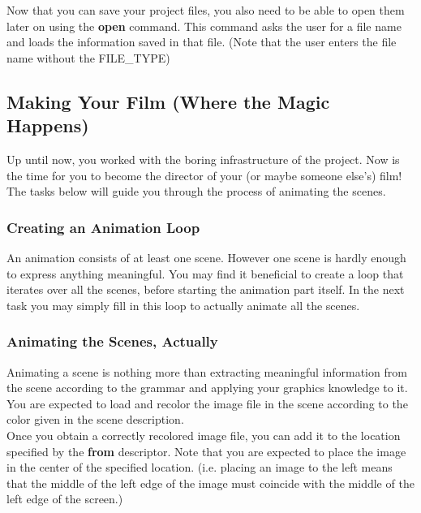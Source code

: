 \documentclass[a4paper]{article}
\begin{document}
	Now that you can save your project files, you also need to be able to open them later on using the \textbf{open} command. This command asks the user for a file name and loads the information saved in that file. (Note that the user enters the file name without the FILE\_TYPE)
	
	\subsection{Making Your Film (Where the Magic Happens)}
	Up until now, you worked with the boring infrastructure of the project. Now is the time for you to become the director of your (or maybe someone else's) film! The tasks below will guide you through the process of animating the scenes.
 	
	\subsubsection{Creating an Animation Loop}
	An animation consists of at least one scene. However one scene is hardly enough to express anything meaningful. You may find it beneficial to create a loop that iterates over all the scenes, before starting the animation part itself. In the next task you may simply fill in this loop to actually animate all the scenes.
	
	\subsubsection{Animating the Scenes, Actually}
	Animating a scene is nothing more than extracting meaningful information from the scene according to the grammar and applying your graphics knowledge to it. You are expected to load and recolor the image file in the scene according to the color given in the scene description.\\
	
	Once you obtain a correctly recolored image file, you can add it to the location specified by the \textbf{from} descriptor. Note that you are expected to place the image in the center of the specified location. (i.e. placing an image to the left means that the middle of the left edge of the image must coincide with the middle of the left edge of the screen.)\\
	
\end{document}
